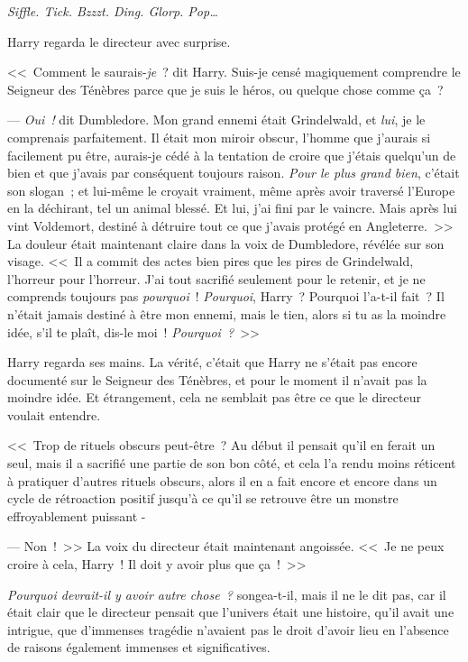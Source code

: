 \later

\emph{Siffle. Tick. Bzzzt. Ding. Glorp. Pop…}

Harry regarda le directeur avec surprise.

<<~Comment le saurais-\emph{je}~? dit Harry. Suis-je censé magiquement comprendre le Seigneur des Ténèbres parce que je suis le héros, ou quelque chose comme ça~?

--- \emph{Oui~!} dit Dumbledore. Mon grand ennemi était Grindelwald, et \emph{lui}, je le comprenais parfaitement. Il était mon miroir obscur, l'homme que j'aurais si facilement pu être, aurais-je cédé à la tentation de croire que j'étais quelqu'un de bien et que j'avais par conséquent toujours raison. \emph{Pour le plus grand bien}, c'était son slogan~; et lui-même le croyait vraiment, même après avoir traversé l'Europe en la déchirant, tel un animal blessé. Et lui, j'ai fini par le vaincre. Mais après lui vint Voldemort, destiné à détruire tout ce que j'avais protégé en Angleterre.~>> La douleur était maintenant claire dans la voix de Dumbledore, révélée sur son visage. <<~Il a commit des actes bien pires que les pires de Grindelwald, l'horreur pour l'horreur. J'ai tout sacrifié seulement pour le retenir, et je ne comprends toujours pas \emph{pourquoi}~! \emph{Pourquoi}, Harry~? Pourquoi l'a-t-il fait~? Il n'était jamais destiné à être mon ennemi, mais le tien, alors si tu as la moindre idée, s'il te plaît, dis-le moi~! \emph{Pourquoi~?}~>>

Harry regarda ses mains. La vérité, c'était que Harry ne s'était pas encore documenté sur le Seigneur des Ténèbres, et pour le moment il n'avait pas la moindre idée. Et étrangement, cela ne semblait pas être ce que le directeur voulait entendre.

<<~Trop de rituels obscurs peut-être~? Au début il pensait qu'il en ferait un seul, mais il a sacrifié une partie de son bon côté, et cela l'a rendu moins réticent à pratiquer d'autres rituels obscurs, alors il en a fait encore et encore dans un cycle de rétroaction positif jusqu'à ce qu'il se retrouve être un monstre effroyablement puissant -

--- Non~!~>> La voix du directeur était maintenant angoissée. <<~Je ne peux croire à cela, Harry~! Il doit y avoir plus que ça~!~>>

\emph{Pourquoi devrait-il y avoir autre chose~?} songea-t-il, mais il ne le dit pas, car il était clair que le directeur pensait que l'univers était une histoire, qu'il avait une intrigue, que d'immenses tragédie n'avaient pas le droit d'avoir lieu en l'absence de raisons également immenses et significatives.

